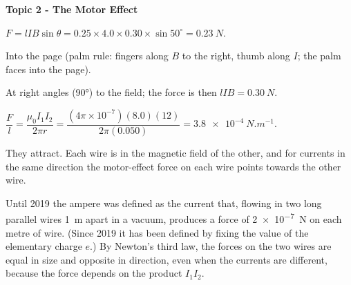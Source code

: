 \documentclass[12pt]{article}
\newcommand\anstopic[1]{\par\Needspace{8\baselineskip}\vspace{4mm}%
  \begin{center}{\headfont\bfseries\fontsize{14}{18}\selectfont #1\par}\end{center}\vspace{2pt}}
\begin{document}
\anstopic{Topic 2 - The Motor Effect}

\ansq
{}
\begin{crit}
\end{crit}
\sample
$F = lIB\sin\theta = 0.25 \times 4.0 \times 0.30 \times \sin 50^\circ = \qty{0.23}{N}$.
\begin{crit}
\end{crit}
\sample
Into the page (palm rule: fingers along $B$ to the right, thumb along $I$; the palm faces into the
page).
\begin{crit}
\end{crit}
\sample
At right angles (\ang{90}) to the field; the force is then $lIB = \qty{0.30}{N}$.

\ansq
{}
\begin{crit}
\end{crit}
\sample
$\dfrac{F}{l} = \dfrac{\mu_0 I_1 I_2}{2\pi r} = \dfrac{(4\pi\times10^{-7})(8.0)(12)}{2\pi(0.050)}
= \qty{3.8e-4}{N.m^{-1}}$.
\begin{crit}
\end{crit}
\sample
They attract. Each wire is in the magnetic field of the other, and for currents in the same direction
the motor-effect force on each wire points towards the other wire.
\begin{crit}
\end{crit}
\sample
Until 2019 the ampere was defined as the current that, flowing in two long parallel wires \qty{1}{m}
apart in a vacuum, produces a force of \qty{2e-7}{N} on each metre of wire. (Since 2019 it has been
defined by fixing the value of the elementary charge $e$.) By Newton's third law, the forces on the
two wires are equal in size and opposite in direction, even when the currents are different, because
the force depends on the product $I_1 I_2$.
\end{document}
